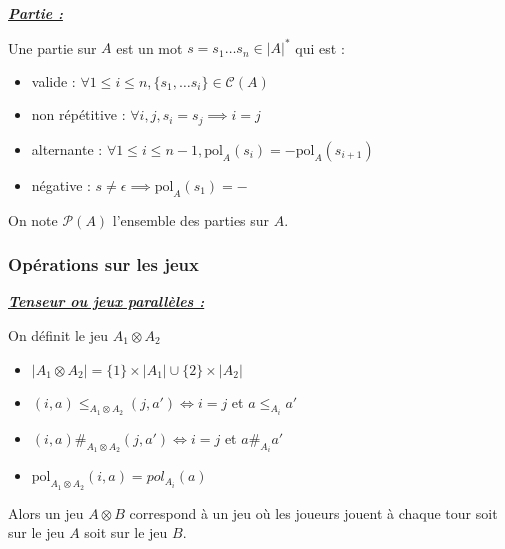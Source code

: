 \documentclass[a4paper,12ptCOUCOU
]{article}
\newlength{\mydepth}
\newlength{\myheight}
\newenvironment{answer}
{\par\begin{lrbox}{\mybox}\quad\begin{minipage}{\linewidth}\color{black}\setlength{\parskip}{10pt plus 1pt minus 1pt}\vspace*{-.7\baselineskip}}
{\end{minipage}\end{lrbox}
\settodepth{\mydepth}{\usebox{\mybox}}
\settoheight{\myheight}{\usebox{\mybox}}
\addtolength{\myheight}{\mydepth}
\noindent\makebox[0pt]{
  \color{gray}\hspace{-0pt}\rule[-\mydepth]{1pt}{\myheight}}
\usebox{\mybox}
  }
\begin{document}
\vspace{0.4cm}\begin{minipage}{\linewidth}\textbf{\textit{\underline{ Partie : }}} \begin{answer}
Une partie sur $A$ est un mot $s = s_1 \dots s_n \in |A|^*$ qui est :
\begin{itemize}
\item valide :
$\forall 1\leq i \leq n, \{s_1, \dots s_i\} \in \mathcal{C}(A)$

\item non répétitive :
$\forall i, j, s_i = s_j \implies i = j$

\item alternante :
$\forall 1 \leq i \leq n-1, \text{pol}_A(s_i) = - \text{pol}_A(s_{i+1})$

\item négative :
$s \neq \epsilon \implies \text{pol}_A(s_1) = -$
\end{itemize}
\end{answer}\end{minipage}

On note $\mathcal{P}(A)$ l'ensemble des parties sur $A$.

\subsubsection{Opérations sur les jeux}

\vspace{0.4cm}\begin{minipage}{\linewidth}\textbf{\textit{\underline{ Tenseur ou jeux parallèles : }}} \begin{answer}
On définit le jeu $A_1 \otimes A_2$
\begin{itemize}
\item $|A_1 \otimes A_2| = \{1\} \times |A_1| \cup \{2\} \times |A_2|$
\item $(i,a) \leq_{A_1 \otimes A_2} (j, a') \iff i = j $ et $a \leq_{A_i} a'$
\item $(i,a) \#_{A_1 \otimes A_2} (j,a') \iff i = j$ et $a \#_{A_i} a'$
\item $\text{pol}_{A_1 \otimes A_2}(i,a) = pol_{A_i} (a)$
\end{itemize}
\end{answer}\end{minipage}

Alors un jeu $A\otimes B$ correspond à un jeu où les joueurs jouent
à chaque tour soit sur le jeu $A$ soit sur le jeu $B$.
\end{document}
